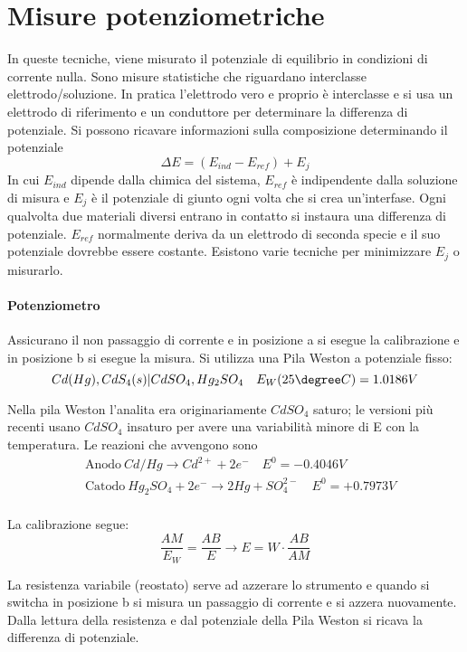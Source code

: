 \section{Misure potenziometriche}
In queste tecniche, viene misurato il potenziale di equilibrio in condizioni di corrente nulla.
Sono misure statistiche che riguardano interclasse elettrodo/soluzione.
In pratica l'elettrodo vero e proprio è interclasse e si usa un elettrodo di riferimento e un conduttore per determinare la differenza di potenziale.
Si possono ricavare informazioni sulla composizione determinando il potenziale
\[
\Delta E = (E_{ind} - E_{ref}) + E_j
\]
In cui $E_{ind}$ dipende dalla chimica del sistema, $E_{ref}$ è indipendente dalla soluzione di misura e $E_j$ è il potenziale di giunto ogni volta che si crea un'interfase.
Ogni qualvolta due materiali diversi entrano in contatto si instaura una differenza di potenziale.
$E_{ref}$ normalmente deriva da un elettrodo di seconda specie e il suo potenziale dovrebbe essere costante.
Esistono varie tecniche per minimizzare $E_j$ o misurarlo.

\paragraph{Potenziometro}
Assicurano il non passaggio di corrente e in posizione a si esegue la calibrazione e in posizione b si esegue la misura.
Si utilizza una Pila Weston a potenziale fisso:
\[
Cd(Hg), CdS_4 (s) | CdSO_4, Hg_2SO_4 \quad E_W (25 \degree C) = 1.0186 V
\]


Nella pila Weston l'analita era originariamente $CdSO_4$ saturo; le versioni più recenti usano $CdSO_4$ insaturo per avere una variabilità minore di E con la temperatura.
Le reazioni che avvengono sono
\begin{align*}
& \text{Anodo} \: Cd/Hg \rightarrow Cd^{2+} + 2e^- \quad E^0 = -0.4046 V\\
& \text{Catodo} \: Hg_2SO_4 + 2e^- \rightarrow 2 Hg + SO_4^{2-} \quad E^0 = +0.7973 V\\
\end{align*}

La calibrazione segue:
\[
\frac{AM}{E_W} = \frac{AB}{E} \rightarrow E = W \cdot \frac{AB}{AM}
\]

La resistenza variabile (reostato) serve ad azzerare lo strumento e quando si switcha in posizione b si misura un passaggio di corrente e si azzera nuovamente.
Dalla lettura della resistenza e dal potenziale della Pila Weston si ricava la differenza di potenziale.

